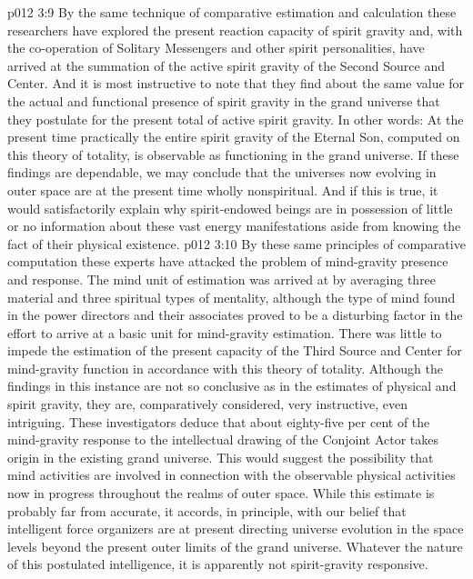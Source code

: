 \pc \vs p012 3:9 \bibnobreakspace {} By the same technique of comparative estimation and calculation these researchers have explored the present reaction capacity of spirit gravity and, with the co\hyp{}operation of Solitary Messengers and other spirit personalities, have arrived at the summation of the active spirit gravity of the Second Source and Center. And it is most instructive to note that they find about the same value for the actual and functional presence of spirit gravity in the grand universe that they postulate for the present total of active spirit gravity. In other words: At the present time practically the entire spirit gravity of the Eternal Son, computed on this theory of totality, is observable as functioning in the grand universe. If these findings are dependable, we may conclude that the universes now evolving in outer space are at the present time wholly nonspiritual. And if this is true, it would satisfactorily explain why spirit\hyp{}endowed beings are in possession of little or no information about these vast energy manifestations aside from knowing the fact of their physical existence.
\pc \vs p012 3:10 \bibnobreakspace {} By these same principles of comparative computation these experts have attacked the problem of mind\hyp{}gravity presence and response. The mind unit of estimation was arrived at by averaging three material and three spiritual types of mentality, although the type of mind found in the power directors and their associates proved to be a disturbing factor in the effort to arrive at a basic unit for mind\hyp{}gravity estimation. There was little to impede the estimation of the present capacity of the Third Source and Center for mind\hyp{}gravity function in accordance with this theory of totality. Although the findings in this instance are not so conclusive as in the estimates of physical and spirit gravity, they are, comparatively considered, very instructive, even intriguing. These investigators deduce that about eighty\hyp{}five per cent of the mind\hyp{}gravity response to the intellectual drawing of the Conjoint Actor takes origin in the existing grand universe. This would suggest the possibility that mind activities are involved in connection with the observable physical activities now in progress throughout the realms of outer space. While this estimate is probably far from accurate, it accords, in principle, with our belief that intelligent force organizers are at present directing universe evolution in the space levels beyond the present outer limits of the grand universe. Whatever the nature of this postulated intelligence, it is apparently not spirit\hyp{}gravity responsive.\plusone
